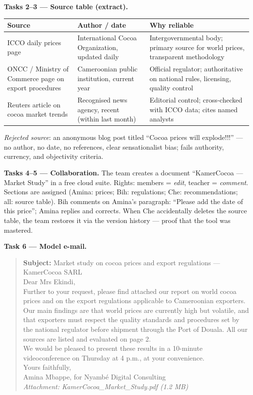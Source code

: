 \documentclass[11pt]{article}
\begin{document}
\textbf{Tasks 2–3 — Source table (extract).}
\begin{center}
\begin{tabularx}{\linewidth}{|l|X|X|}\hline
\rowcolor{popblueL}\textbf{Source} & \textbf{Author / date} & \textbf{Why reliable} \\ \hline
ICCO daily prices page & International Cocoa Organization, updated daily & Intergovernmental body; primary source for world prices, transparent methodology \\ \hline
ONCC / Ministry of Commerce page on export procedures & Cameroonian public institution, current year & Official regulator; authoritative on national rules, licensing, quality control \\ \hline
Reuters article on cocoa market trends & Recognised news agency, recent (within last month) & Editorial control; cross-checked with ICCO data; cites named analysts \\ \hline
\end{tabularx}
\end{center}
\emph{Rejected source}: an anonymous blog post titled ``Cocoa prices will explode!!!'' — no author, no date, no references, clear sensationalist bias; fails authority, currency, and objectivity criteria.

\textbf{Tasks 4–5 — Collaboration.} The team creates a document ``KamerCocoa — Market Study'' in a free cloud suite. Rights: members = \emph{edit}, teacher = \emph{comment}. Sections are assigned (Amina: prices; Bih: regulations; Che: recommendations; all: source table). Bih comments on Amina's paragraph: ``Please add the date of this price''; Amina replies and corrects. When Che accidentally deletes the source table, the team restores it via the version history — proof that the tool was mastered.

\textbf{Task 6 — Model e-mail.}
\begin{quote}
\textbf{Subject:} Market study on cocoa prices and export regulations — KamerCocoa SARL\\[2pt]
Dear Mrs Ekindi,\\
Further to your request, please find attached our report on world cocoa prices and on the export regulations applicable to Cameroonian exporters.\\
Our main findings are that world prices are currently high but volatile, and that exporters must respect the quality standards and procedures set by the national regulator before shipment through the Port of Douala. All our sources are listed and evaluated on page 2.\\
We would be pleased to present these results in a 10-minute videoconference on Thursday at 4 p.m., at your convenience.\\
Yours faithfully,\\
Amina Mbappe, for Nyambé Digital Consulting\\
\emph{Attachment: KamerCocoa\_Market\_Study.pdf (1.2 MB)}
\end{quote}
\end{document}
